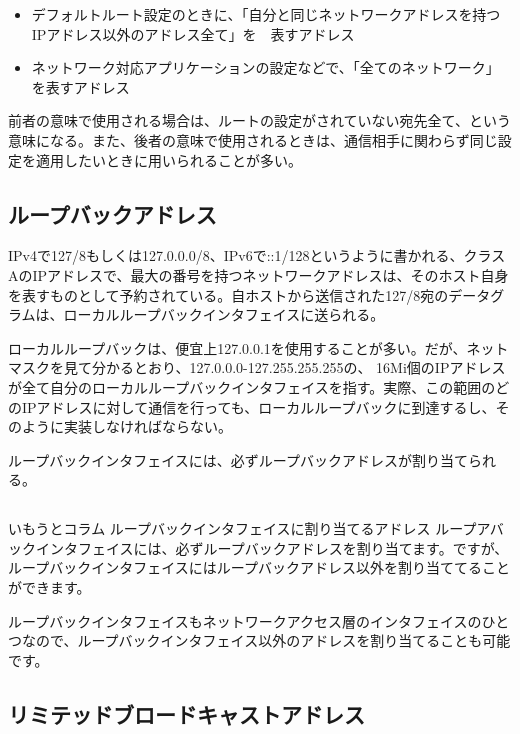 \begin{itemize}
\item デフォルトルート設定のときに、「自分と同じネットワークアドレスを持つIPアドレス以外のアドレス全て」を　表すアドレス
\item ネットワーク対応アプリケーションの設定などで、「全てのネットワーク」を表すアドレス
\end{itemize}

前者の意味で使用される場合は、ルートの設定がされていない宛先全て、という意味になる。また、後者の意味で使用されるときは、通信相手に関わらず同じ設定を適用したいときに用いられることが多い。

\subsection{ループバックアドレス}

IPv4で127/8もしくは127.0.0.0/8、IPv6で::1/128というように書かれる、クラスAのIPアドレスで、最大の番号を持つネットワークアドレスは、そのホスト自身を表すものとして予約されている。自ホストから送信された127/8宛のデータグラムは、ローカルループバックインタフェイスに送られる。

ローカルループバックは、便宜上127.0.0.1を使用することが多い。だが、ネットマスクを見て分かるとおり、127.0.0.0-127.255.255.255の、 16Mi個のIPアドレスが全て自分のローカルループバックインタフェイスを指す。実際、この範囲のどのIPアドレスに対して通信を行っても、ローカルループバックに到達するし、そのように実装しなければならない。

ループバックインタフェイスには、必ずループバックアドレスが割り当てられる。

\subsection*{}
\begin{itembox}[l]{いもうとコラム ループバックインタフェイスに割り当てるアドレス}
ループアバックインタフェイスには、必ずループバックアドレスを割り当てます。ですが、ループバックインタフェイスにはループバックアドレス以外を割り当ててることができます。

ループバックインタフェイスもネットワークアクセス層のインタフェイスのひとつなので、ループバックインタフェイス以外のアドレスを割り当てることも可能です。
\end{itembox}


\subsection{リミテッドブロードキャストアドレス}

